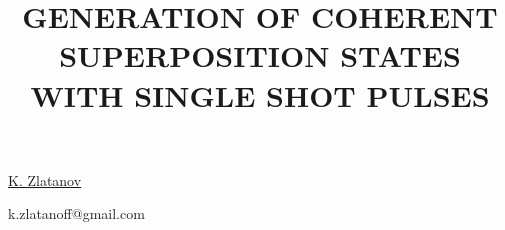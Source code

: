 \title{GENERATION OF COHERENT SUPERPOSITION STATES WITH SINGLE SHOT PULSES}

\underline{K. Zlatanov} 

{\normalsize{\vspace{-4mm}
\darmstadt

\email k.zlatanoff@gmail.com}}




\vspace{\baselineskip}